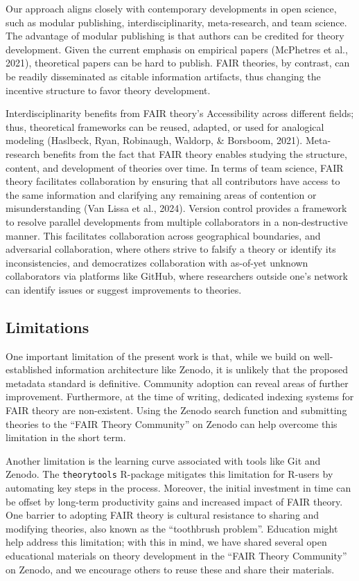\documentclass[
  man, noextraspace,floatsintext]{apa6}
\begin{document}
Our approach aligns closely with contemporary developments in open science,
such as modular publishing, interdisciplinarity, meta-research, and team science.
The advantage of modular publishing is that authors can be credited for theory development.
Given the current emphasis on empirical papers (McPhetres et al., 2021), theoretical papers can be hard to publish.
FAIR theories, by contrast, can be readily disseminated as citable information artifacts, thus changing the incentive structure to favor theory development.

Interdisciplinarity benefits from FAIR theory's Accessibility across different fields; thus, theoretical frameworks can be reused, adapted, or used for analogical modeling (Haslbeck, Ryan, Robinaugh, Waldorp, \& Borsboom, 2021).
Meta-research benefits from the fact that FAIR theory enables studying the structure, content, and development of theories over time.
In terms of team science, FAIR theory facilitates collaboration by ensuring that all contributors have access to the same information and
clarifying any remaining areas of contention or misunderstanding (Van Lissa et al., 2024).
Version control provides a framework to resolve parallel developments from multiple collaborators in a non-destructive manner.
This facilitates collaboration across geographical boundaries,
and adversarial collaboration, where others strive to falsify a theory or identify its inconsistencies, and democratizes collaboration with as-of-yet unknown collaborators via platforms like GitHub, where researchers outside one's network can identify issues or suggest improvements to theories.

\subsection{Limitations}\label{limitations}

One important limitation of the present work is that,
while we build on well-established information architecture like Zenodo,
it is unlikely that the proposed metadata standard is definitive.
Community adoption can reveal areas of further improvement.
Furthermore, at the time of writing, dedicated indexing systems for FAIR theory are non-existent.
Using the Zenodo search function and submitting theories to the ``FAIR Theory Community'' on Zenodo can help overcome this limitation in the short term.

Another limitation is the learning curve associated with tools like Git and Zenodo.
The \texttt{theorytools} R-package mitigates this limitation for R-users by automating key steps in the process.
Moreover, the initial investment in time can be offset by long-term productivity gains and increased impact of FAIR theory.
One barrier to adopting FAIR theory is cultural resistance to sharing and modifying theories, also known as the ``toothbrush problem''.
Education might help address this limitation; with this in mind,
we have shared several open educational materials on theory development in the ``FAIR Theory Community'' on Zenodo, and we encourage others to reuse these and share their materials.
\end{document}

